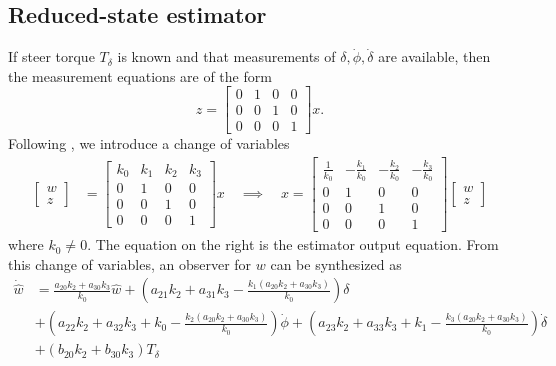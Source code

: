 \documentclass[letterpaper,11pt]{article}
\begin{document}
\subsection{Reduced-state estimator} \label{reducedstate}
If steer torque $T_\delta$ is known and that measurements of $\delta,
\dot{\phi}, \dot{\delta}$ are available, then the measurement equations are of
the form
\begin{equation*}
z = \left[\begin{smallmatrix}0 & 1 & 0 & 0\\ 0 & 0 & 1 & 0\\ 0 & 0 & 0 &
1\end{smallmatrix}\right] x.
\end{equation*}
Following \cite{Bryson1970}, we introduce a change of variables
\begin{align}
\left[\begin{smallmatrix}w \\ z\end{smallmatrix}\right] &=
\left[\begin{smallmatrix}k_0 & k_1 & k_2 & k_3 \\ 0 & 1 & 0 & 0\\ 0 & 0 & 1 & 0\\ 0 & 0 & 0 &
1\end{smallmatrix}\right] x  \quad\implies\quad
x =
\left[\begin{smallmatrix}\frac{1}{k_{0}} & - \frac{k_{1}}{k_{0}} & -
  \frac{k_{2}}{k_{0}} & - \frac{k_{3}}{k_{0}}\\0 & 1 & 0 & 0\\0 & 0 & 1 & 0\\0
  & 0 & 0 & 1\end{smallmatrix}\right]\left[\begin{smallmatrix} w \\ z\end{smallmatrix}\right]
\label{eq:cov}
\end{align}
where $k_0\ne0$. The equation on the right is the estimator output equation.
From this change of variables, an observer for $w$ can be synthesized as
\begin{align*}
\dot{\hat{w}} &= \frac{a_{20} k_{2} + a_{30} k_{3}}{k_{0}} \hat{w}
 + \left(a_{21} k_{2} + a_{31} k_{3} - \frac{k_{1} \left(a_{20} k_{2} + a_{30} k_{3}\right)}{k_{0}}\right) \delta \\
 &+ \left(a_{22} k_{2} + a_{32} k_{3} + k_{0} - \frac{k_{2} \left(a_{20} k_{2} + a_{30} k_{3}\right)}{k_{0}}\right) \dot{\phi}
 + \left(a_{23} k_{2} + a_{33} k_{3} + k_{1} - \frac{k_{3} \left(a_{20} k_{2} + a_{30} k_{3}\right)}{k_{0}}\right) \dot{\delta} \\
 &+ \left(b_{20} k_{2} + b_{30} k_{3}\right) T_\delta
\end{align*}
\end{document}
